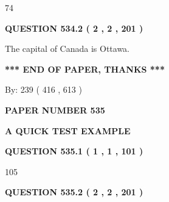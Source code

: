 \documentclass[12pt]{article}
\begin{document}
74
 
 
  
\vspace{0.2in}
  
{\textbf{\Large{QUESTION
534.2 
 ( 2 , 2 , 201 )
}}}
  
  
 
 
\noindent{}
 
 
The capital of Canada is Ottawa.
 
 
 
 
   
   
 \vspace{0.2in}
 
   
   
   
   
\vspace{1.0in} 
{\textbf{\large{ *** END OF PAPER, THANKS *** }}} 
   
   
\hspace{1.0in} By: 
 239 ( 416 ,  613 )
   
   
   
   
\newpage 
\setcounter{page}{ 
   535001 } 
   
   
   
   
 {\textbf{ \Large{ PAPER NUMBER  535  }}}
   
   
\vspace{0.2in}
   
   
   
   
   
   
 \vspace{0.2in}
{\LARGE {\textbf{ A QUICK TEST EXAMPLE}}}
   
   
  
\vspace{0.2in}
  
{\textbf{\Large{QUESTION
535.1 
 ( 1 , 1 , 101 )
}}}
  
  
 
 
\noindent{}

105
 
 
  
\vspace{0.2in}
  
{\textbf{\Large{QUESTION
535.2 
 ( 2 , 2 , 201 )
}}}
  
\end{document}
